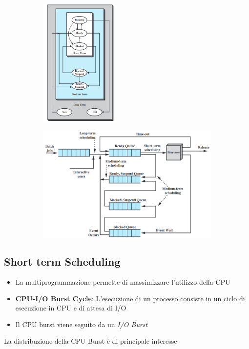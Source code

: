 \documentclass[12pt, a4paper]{article}
\begin{document}
	\begin{figure}[!htbp]
		\centering
		\begin{subfigure}{.3\textwidth}
			\centering
			\includegraphics[width=4cm]{SO_PNGs/levels-of-scheduling_SO.png}
			\caption*{}
			\label{fig:levels-of-scheduling}
		\end{subfigure}%
		\begin{subfigure}{.7\textwidth}
			\centering
			\includegraphics[width=12cm]{SO_PNGs/queueing-diagram-scheduling_SO.png}
			\caption*{}
			\label{fig:queueing-diagram-scheduling}
		\end{subfigure}%
		
	\end{figure}

	
	\subsection*{Short term Scheduling}
	
	\begin{itemize}
		\item La multiprogrammazione permette di massimizzare l'utilizzo della CPU
		\item \textbf{CPU-I/O Burst Cycle}: L'esecuzione di un processo consiste in un ciclo di esecuzione in CPU e di attesa di I/O
		\item Il CPU burst viene seguito da un \textit{I/O Burst} 
	\end{itemize}
	La distribuzione della CPU Burst è di principale interesse
	
\end{document}
